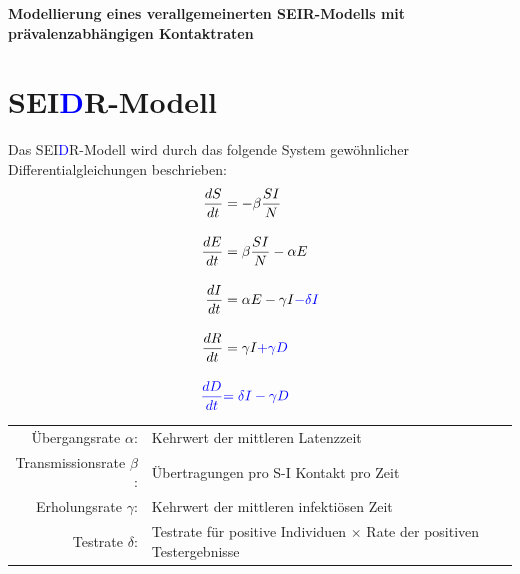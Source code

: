 \documentclass{scrartcl}
\begin{document}
\begin{center}
\huge\textbf{Modellierung eines verallgemeinerten SEIR-Modells mit prävalenzabhängigen Kontaktraten}
\end{center}

\section{SEI\textcolor{blue}{D}R-Modell}

Das SEI\textcolor{blue}{D}R-Modell wird durch das folgende System gewöhnlicher Differentialgleichungen beschrieben:
\begin{align*}
\frac{dS}{dt} &= -\beta \frac{SI}{N} \\[10pt]
\frac{dE}{dt} &= \beta \frac{SI}{N} - \alpha E \\[10pt]
\frac{dI}{dt} &= \alpha E - \gamma I \textcolor{blue}{- \delta I} \\[10pt] 
\frac{dR}{dt} &= \gamma I \textcolor{blue}{+ \gamma D} \\[10pt] 
\textcolor{blue}{\frac{dD}{dt}} &\textcolor{blue}{= \delta I - \gamma D}
\end{align*}

\begin{tabular}{rl}
	Übergangsrate $\alpha$:& Kehrwert der mittleren Latenzzeit \\
	Transmissionsrate $\beta$:& Übertragungen pro S-I Kontakt pro Zeit \\
	Erholungsrate $\gamma$:& Kehrwert der mittleren infektiösen Zeit\\
	Testrate $\delta$: &  Testrate für positive Individuen $\times$ Rate der positiven Testergebnisse
\end{tabular}

%
%
\end{document}
